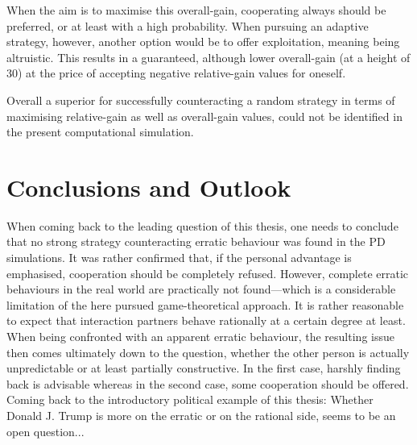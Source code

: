 \documentclass[11pt]{article}
\begin{document}
	When the aim is to maximise this overall-gain, cooperating always should be preferred, or at least with a high probability.
	When pursuing an adaptive strategy, however, another option would be to offer exploitation, meaning being altruistic.
	This results in a guaranteed, although lower overall-gain (at a height of 30) at the price of accepting negative relative-gain values for oneself.

	Overall a superior for successfully counteracting a random strategy in terms of maximising relative-gain as well as overall-gain values, could not be identified in the present computational simulation.

\section{Conclusions and Outlook} \label{sec:conclusion}
	
	When coming back to the leading question of this thesis, one needs to conclude that no strong strategy counteracting erratic behaviour was found in the PD simulations.
	It was rather confirmed that, if the personal advantage is emphasised, cooperation should be completely refused.
	However, complete erratic behaviours in the real world are practically not found---which is a considerable limitation of the here pursued game-theoretical approach.
	It is rather reasonable to expect that interaction partners behave rationally at a certain degree at least. 
	When being confronted with an apparent erratic behaviour, the resulting issue then comes ultimately down to the question, whether the other person is actually unpredictable or at least partially constructive.
	In the first case, harshly finding back is advisable whereas in the second case, some cooperation should be offered. 
	Coming back to the introductory political example of this thesis: Whether Donald J. Trump is more on the erratic or on the rational side, seems to be an open question...
\end{document}
